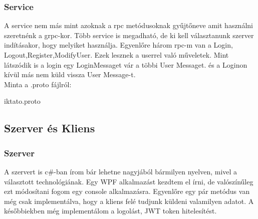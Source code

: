 \documentclass[conference]{IEEEtran}
\begin{document}
\subsubsection{Service}

A service nem más mint azoknak a rpc metódusoknak gyűjtőneve amit használni szeretnénk a grpc-kor. Több service is megadható, de ki kell választanunk szerver indításakor, hogy melyiket használja. Egyenlőre három rpc-m van a Login, Logout,Register,ModifyUser. Ezek lesznek a userrel való műveletek. Mint látszódik is a login egy LoginMessaget vár a többi User Messaget. és a Loginon kívül más nem küld vissza User Message-t.
\\Minta a .proto fájlról:
\begin{lstinputlisting}{iktato.proto}
	
\end{lstinputlisting}
\subsection{\textbf{Szerver és Kliens}}

\subsubsection{Szerver}

A szervert is c\#-ban írom bár lehetne nagyjából bármilyen nyelven, mivel a választott technológiának. Egy WPF alkalmazást kezdtem el írni, de valószínűleg ezt módosítani fogom egy console alkalmazásra. Egyenlőre egy pár metódus van még csak implementálva, hogy a kliens felé tudjunk küldeni valamilyen adatot. A későbbiekben még implementálom a logolást, JWT token hitelesítést. 
\end{document}
